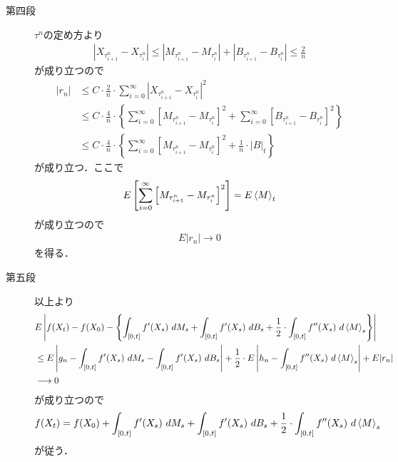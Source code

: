 \begin{sketch}
\begin{description}
			\item[第四段]
				$\tau^{n}$の定め方より
				\begin{align}
					\left|X_{\tau^{n}_{i+1}} - X_{\tau^{n}_{i}}\right|
					\leq \left|M_{\tau^{n}_{i+1}} - M_{\tau^{n}_{i}}\right|
					+ \left|B_{\tau^{n}_{i+1}} - B_{\tau^{n}_{i}}\right|
					\leq \frac{2}{n}
				\end{align}
				が成り立つので
				\begin{align}
					|r_{n}|
					&\leq C \cdot \frac{2}{n} \cdot \sum_{i=0}^{\infty} \left|X_{\tau^{n}_{i+1}} - X_{\tau^{n}_{i}}\right|^{2} \\
					&\leq C \cdot \frac{4}{n} \cdot
					\left\{
						\sum_{i=0}^{\infty} \left[M_{\tau^{n}_{i+1}} - M_{\tau^{n}_{i}}\right]^{2}
						+ \sum_{i=0}^{\infty} \left[B_{\tau^{n}_{i+1}} - B_{\tau^{n}_{i}}\right]^{2}
					\right\} \\
					&\leq C \cdot \frac{4}{n} \cdot
					\left\{
						\sum_{i=0}^{\infty} \left[M_{\tau^{n}_{i+1}} - M_{\tau^{n}_{i}}\right]^{2}
						+ \frac{1}{n} \cdot |B|_{t}
					\right\}
				\end{align}
				が成り立つ．ここで
				\begin{align}
					E\left[\sum_{i=0}^{\infty} \left[M_{\tau^{n}_{i+1}} - M_{\tau^{n}_{i}}\right]^{2}\right]
					= E\inprod<M>_{t}
					\label{fom:Ito_formula_3}
				\end{align}
				が成り立つので
				\begin{align}
					E|r_{n}| \longrightarrow 0
				\end{align}
				を得る．
			
			\item[第五段]
				以上より
				\begin{align}
					&E\left|f(X_{t}) - f(X_{0})
					- \left\{\int_{[0,t]} f'(X_{s})\ dM_{s} 
					+ \int_{[0,t]} f'(X_{s})\ dB_{s}
					+ \frac{1}{2} \cdot \int_{[0,t]} f''(X_{s})\ d\inprod<M>_{s}\right\}\right| \\
					&\leq E\left| g_{n} - \int_{[0,t]} f'(X_{s})\ dM_{s} 
					- \int_{[0,t]} f'(X_{s})\ dB_{s} \right|
					+ \frac{1}{2} \cdot E\left| h_{n} - \int_{[0,t]} f''(X_{s})\ d\inprod<M>_{s} \right| 
					+ E|r_{n}| \\
					&\longrightarrow 0 
				\end{align}
				が成り立つので
				\begin{align}
					f(X_{t}) = f(X_{0}) + \int_{[0,t]} f'(X_{s})\ dM_{s} 
					+ \int_{[0,t]} f'(X_{s})\ dB_{s}
					+ \frac{1}{2} \cdot \int_{[0,t]} f''(X_{s})\ d\inprod<M>_{s}
				\end{align}
				が従う．
			

\end{description}
\end{sketch}
